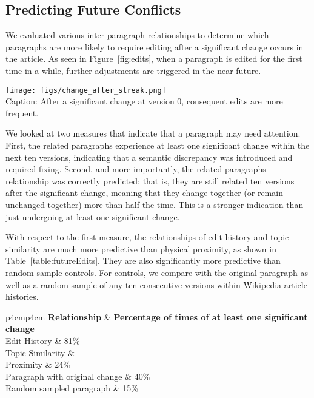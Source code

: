 \subsection{Predicting Future
Conflicts}\label{predicting-future-conflicts-1}

We evaluated various inter-paragraph relationships to determine which
paragraphs are more likely to require editing after a significant change
occurs in the article. As seen in Figure~{[}fig:edits{]}, when a
paragraph is edited for the first time in a while, further adjustments
are triggered in the near future.

\texttt{[image: figs/change\_after\_streak.png]}\\

Caption: After a significant change at version 0, consequent edits are
more frequent.

We looked at two measures that indicate that a paragraph may need
attention. First, the related paragraphs experience at least one
significant change within the next ten versions, indicating that a
semantic discrepancy was introduced and required fixing. Second, and
more importantly, the related paragraphs relationship was correctly
predicted; that is, they are still related ten versions after the
significant change, meaning that they change together (or remain
unchanged together) more than half the time. This is a stronger
indication than just undergoing at least one significant change.

With respect to the first measure, the relationships of edit history and
topic similarity are much more predictive than physical proximity, as
shown in Table~{[}table:futureEdits{]}. They are also significantly more
predictive than random sample controls. For controls, we compare with
the original paragraph as well as a random sample of any ten consecutive
versions within Wikipedia article histories.

{\textbar{}p{4cm}\textbar{}p{4cm}\textbar{}} \textbf{Relationship} \&
\textbf{Percentage of times of at least one significant change}\\Edit
History \& 81\%\\Topic Similarity \&\\

Proximity \& 24\%\\

Paragraph with original change \& 40\%\\

Random sampled paragraph \& 15\%\\

